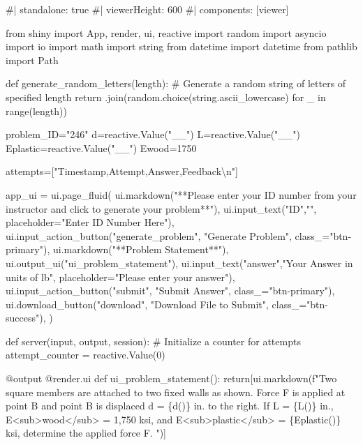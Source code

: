 \documentclass[
  letterpaper,
  DIV=11,
  numbers=noendperiod]{scrreprt}
\newenvironment{Shaded}{\begin{snugshade}}{\end{snugshade}}
\newcommand{\NormalTok}[1]{\textcolor[rgb]{0.00,0.23,0.31}{#1}}
\begin{document}
\begin{Shaded}
\begin{Highlighting}[]
\NormalTok{\#| standalone: true}
\NormalTok{\#| viewerHeight: 600}
\NormalTok{\#| components: [viewer]}

\NormalTok{from shiny import App, render, ui, reactive}
\NormalTok{import random}
\NormalTok{import asyncio}
\NormalTok{import io}
\NormalTok{import math}
\NormalTok{import string}
\NormalTok{from datetime import datetime}
\NormalTok{from pathlib import Path}

\NormalTok{def generate\_random\_letters(length):}
\NormalTok{    \# Generate a random string of letters of specified length}
\NormalTok{    return \textquotesingle{}\textquotesingle{}.join(random.choice(string.ascii\_lowercase) for \_ in range(length)) }

\NormalTok{problem\_ID="246"}
\NormalTok{d=reactive.Value("\_\_")}
\NormalTok{L=reactive.Value("\_\_")}
\NormalTok{Eplastic=reactive.Value("\_\_")}
\NormalTok{Ewood=1750}

\NormalTok{attempts=["Timestamp,Attempt,Answer,Feedback\textbackslash{}n"]}

\NormalTok{app\_ui = ui.page\_fluid(}
\NormalTok{    ui.markdown("**Please enter your ID number from your instructor and click to generate your problem**"),}
\NormalTok{    ui.input\_text("ID","", placeholder="Enter ID Number Here"),}
\NormalTok{    ui.input\_action\_button("generate\_problem", "Generate Problem", class\_="btn{-}primary"),}
\NormalTok{    ui.markdown("**Problem Statement**"),}
\NormalTok{    ui.output\_ui("ui\_problem\_statement"),}
\NormalTok{    ui.input\_text("answer","Your Answer in units of lb", placeholder="Please enter your answer"),}
\NormalTok{    ui.input\_action\_button("submit", "Submit Answer", class\_="btn{-}primary"),}
\NormalTok{    ui.download\_button("download", "Download File to Submit", class\_="btn{-}success"),}
\NormalTok{)}


\NormalTok{def server(input, output, session):}
\NormalTok{    \# Initialize a counter for attempts}
\NormalTok{    attempt\_counter = reactive.Value(0)}

\NormalTok{    @output}
\NormalTok{    @render.ui}
\NormalTok{    def ui\_problem\_statement():}
\NormalTok{        return[ui.markdown(f"Two square members are attached to two fixed walls as shown. Force F is applied at point B and point B is displaced d =  \{d()\} in. to the right. If L = \{L()\} in., E\textless{}sub\textgreater{}wood\textless{}/sub\textgreater{} = 1,750 ksi, and E\textless{}sub\textgreater{}plastic\textless{}/sub\textgreater{} = \{Eplastic()\} ksi, determine the applied force F. ")]}
    

\end{Highlighting}
\end{Shaded}
\end{document}
